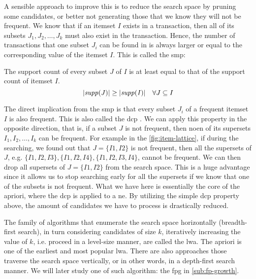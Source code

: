 A sensible approach to improve this is to reduce the search space by pruning some candidates, or better not generating those that we know they will not be frequent.
We know that if an itemset $I$ exists in a transaction, then all of its subsets $J_1, J_2, \dots, J_k$ must also exist in the transaction.
Hence, the number of transactions that one subset $J_i$ can be found in is always larger or equal to the corresponding value of the itemset $I$.
This is called the \acl{smp}:
\begin{definition}
    The support count of every subset $J$ of $I$ is at least equal to that of the support count of itemset $I$.
    \begin{equation}
        \lvert \mathit{supp({J})} \rvert \geq \lvert \mathit{supp({I})} \rvert \quad \forall J \subseteq I
    \end{equation}
\end{definition}

The direct implication from the \acl{smp} is that every subset $J_i$ of a frequent itemset $I$ is also frequent.
This is also called the \acl{dcp} \citep{Aggarwal15}.
We can apply this property in the opposite direction, that is, if a subset $J$ is not frequent, then noen of its supersets $I_1, I_2, \dots, I_k$ can be frequent.
For example in the \autoref{fig:item-lattice}, if during the searching, we found out that $J = \{I1, I2\}$ is not frequent, then all the supersets of $J$, e.g. $\{I1, I2, I3\}, \{I1, I2 , I4\}, \{I1, I2 , I3, I4\}$, cannot be frequent.
We can then drop all supersets of ${J = \{I1, I2\}}$ from the search space.
This is a huge advantage since it allows us to stop searching early for all the supersets if we know that one of the subsets is not frequent.
What we have here is essentially the core of the \acl{apriori}, where the \acl{dcp} is applied to a \ac{ne}.
By utilizing the simple \acl{dcp} property above, the amount of candidates we have to process is drastically reduced.


The family of algorithms that enumerate the search space horizontally (breadth-first search), in turn considering candidates of size $k$, iteratively increasing the value of $k$, i.e. proceed in a level-size manner, are called the \acl{lwa}.
The \acl{apriori} is one of the earliest and most popular \acl{lwa}.
There are also approaches those traverse the search space vertically, or in other words, in a depth-first search manner.
We will later study one of such algorithm: the \acl{fpg} in \autoref{sub:fp-growth}.

